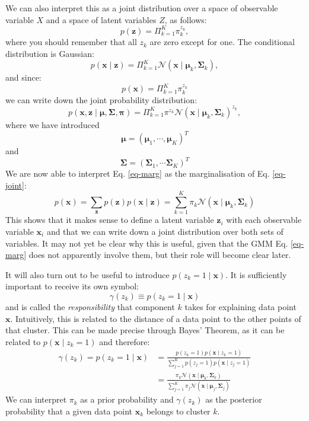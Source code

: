 We can also interpret this as a joint distribution over a space of observable variable $X$ and a space of latent variables $Z$, as follows:
\begin{equation}
  p(\boldsymbol{z}) = \Pi^K_{k=1} \pi^{z_k}_k,
  \label{eq-latent}
\end{equation}
where you should remember that all $z_k$ are zero except for one. The conditional distribution is Gaussian:
\begin{equation}
p(\boldsymbol{x} \mid \boldsymbol{z} ) = \Pi^K_{k=1} \mathcal{N}(\boldsymbol{x} \mid \boldsymbol{\mu}_k, \boldsymbol{\Sigma}_k),
\label{eq-conditional}
\end{equation}
and since:
$$
p(\boldsymbol{x}) = \Pi^K_{k=1} \pi^{z_k}_k
$$
we can write down the joint probability distribution:
\begin{equation}
  p(\boldsymbol{x}, \boldsymbol{z} \mid \boldsymbol{\mu}, \boldsymbol{\Sigma}, \boldsymbol{\pi}) =  \Pi^K_{k=1} \pi^{z_k} 
    \mathcal{N}(\boldsymbol{x} \mid \boldsymbol{\mu}_k, \boldsymbol{\Sigma}_k)^{z_k},
    \label{eq-joint}
\end{equation}
where we have introduced
$$
\boldsymbol{\mu} = (\boldsymbol{\mu}_1, \cdots, \boldsymbol{\mu}_K)^T
$$
and
$$
\boldsymbol{\Sigma} = (\boldsymbol{\Sigma}_1, \cdots \boldsymbol{\Sigma}_K)^T
$$
We are now able to interpret Eq. \ref{eq-marg} as the marginalisation of Eq. \ref{eq-joint}:
$$
p(\boldsymbol{x}) = \sum_{\boldsymbol{z}} p(\boldsymbol{z}) p( \boldsymbol{x} \mid \boldsymbol{z}) = \sum^K_{k=1} \pi_k \mathcal{N}( \boldsymbol{x} \mid \boldsymbol{\mu}_k, \boldsymbol{\Sigma}_k)
$$
This shows that it makes sense to define a latent variable $\boldsymbol{z}_i$ with each observable variable $\boldsymbol{x}_i$ and that we can write down a joint
distribution over both sets of variables. It may not yet be clear why this is useful, given that the GMM Eq. \ref{eq-marg} does not apparently involve them, but
their role will become clear later.

It will also turn out to be useful to introduce $p(z_k = 1 \mid \boldsymbol{x})$. It is sufficiently important to receive its own symbol:
\begin{equation}
\gamma(z_k) \equiv p(z_k = 1 \mid \boldsymbol{x})
\label{eq-respsymb}
\end{equation}
and is called the \emph{responsibility} that component $k$ takes for explaining data point $\boldsymbol{x}$. Intuitively, this is related
to the distance of a data point to the other points of that cluster. This can be made precise through  Bayes' Theorem, as it can be related to
$p(\boldsymbol{x} \mid z_k = 1)$ and therefore:
\begin{align}
  \gamma(z_k)   = p(z_k = 1 \mid \boldsymbol{x} ) & = \frac{p(z_k = 1)p(\boldsymbol{x} \mid z_k = 1) }{\sum^K_{j=1} p(z_j = 1)p(\boldsymbol{x} \mid z_j = 1)} \nonumber \\
  & = \frac{\pi_k \mathcal{N}(\boldsymbol{x} \mid \boldsymbol{\mu}_k, \boldsymbol{\Sigma}_k)}{\sum^K_{j=1} \pi_j \mathcal{N}(\boldsymbol{x} \mid \boldsymbol{\mu}_j, \boldsymbol{\Sigma}_j)}
  \label{eq-resp}
\end{align}
We can interpret $\pi_k$ as a prior probability and $\gamma(z_k)$ as the posterior probability that a  given data point $\boldsymbol{x}_k$ belongs to cluster $k$.
